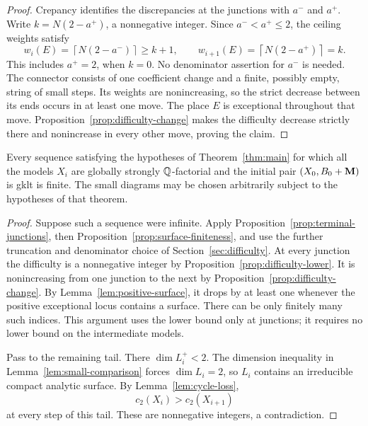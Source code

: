 \begin{proof}
Crepancy identifies the discrepancies at the junctions with \(a^-\) and
\(a^+\).  Write \(k=N(2-a^+)\), a nonnegative integer.  Since
\(a^-<a^+\leq2\), the ceiling weights satisfy
\[
 w_i(E)=\left\lceil N(2-a^-)\right\rceil
 \geq k+1,
 \qquad
 w_{i+1}(E)=\left\lceil N(2-a^+)\right\rceil=k.
\]
This includes \(a^+=2\), when \(k=0\).  No denominator assertion for
\(a^-\) is needed.  The connector consists of one coefficient change and
a finite, possibly empty, string of small steps.  Its weights are
nonincreasing, so the strict decrease between its ends occurs in at least
one move.  The place \(E\) is exceptional throughout that move.
Proposition~\ref{prop:difficulty-change} makes the difficulty decrease
strictly there and nonincrease in every other move, proving the claim.
\end{proof}

\begin{theorem}\label{thm:strong-gklt}
Every sequence satisfying the hypotheses of Theorem~\ref{thm:main} for
which all the models \(X_i\) are globally strongly \(\mathbb{Q}\)-factorial and
the initial pair \((X_0,B_0+\mathbf{M})\) is gklt is finite.  The small diagrams
may be chosen arbitrarily subject to the hypotheses of that theorem.
\end{theorem}

\begin{proof}
Suppose such a sequence were infinite.  Apply
Proposition~\ref{prop:terminal-junctions}, then
Proposition~\ref{prop:surface-finiteness}, and use the further truncation
and denominator choice of Section~\ref{sec:difficulty}.  At every junction
the difficulty is a nonnegative integer by
Proposition~\ref{prop:difficulty-lower}.  It is nonincreasing from one
junction to the next by Proposition~\ref{prop:difficulty-change}.  By
Lemma~\ref{lem:positive-surface}, it drops by at least one whenever the
positive exceptional locus contains a surface.  There can be only finitely
many such indices.  This argument uses the lower bound only at junctions;
it requires no lower bound on the intermediate models.

Pass to the remaining tail.  There \(\dim L_i^+<2\).  The dimension
inequality in Lemma~\ref{lem:small-comparison} forces \(\dim L_i=2\), so
\(L_i\) contains an irreducible compact analytic surface.  By
Lemma~\ref{lem:cycle-loss},
\[
 c_2(X_i)>c_2(X_{i+1})
\]
at every step of this tail.  These are nonnegative integers, a
contradiction.
\end{proof}

